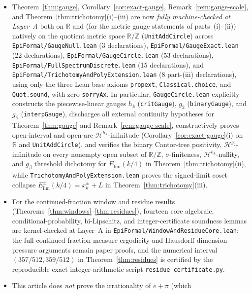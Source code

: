 \documentclass[11pt]{article}
\theoremstyle{definition}
\theoremstyle{remark}
\newcommand{\R}{\mathbb{R}}
\newcommand{\Z}{\mathbb{Z}}
\begin{document}
\begin{itemize}[leftmargin=1.5em]
unweighted-zero strictness witness
(\texttt{Unweighted\allowbreak Correction.\allowbreak witness} in Remark~\ref{rem:unweighted})
are likewise kernel-checked at Layer~A.
\item Theorem~\ref{thm:gauge}, Corollary~\ref{cor:exact-gauge},
Remark~\ref{rem:gauge-scale}, and Theorem~\ref{thm:trichotomy}(i)--(iii) are now
\emph{fully machine-checked at Layer~A} both on $\R$ and (for the metric gauge
statements of parts~(i)--(ii)) natively on the
quotient metric space $\R/\Z$ (\texttt{UnitAddCircle}) across
\texttt{EpiFormal/\allowbreak GaugeNull.lean} (3 declarations),
\texttt{EpiFormal/\allowbreak GaugeExact.lean} (22 declarations),
\texttt{EpiFormal/\allowbreak GaugeCircle.lean} (53 declarations),
\texttt{EpiFormal/\allowbreak FullSpectrumDiscrete.lean} (15 declarations), and
\texttt{EpiFormal/\allowbreak TrichotomyAndPolyExtension.lean} (8 part-(iii)
declarations), using only
the three Lean base axioms \texttt{propext}, \texttt{Classical.choice}, and
\texttt{Quot.sound}, with zero \texttt{sorryAx}. In particular,
\texttt{GaugeCircle.lean} explicitly constructs the piecewise-linear gauges
$h_k$ (\texttt{critGauge}), $g_2$ (\texttt{binaryGauge}), and $g_\beta$
(\texttt{interpGauge}), discharges all external continuity hypotheses for
Theorem~\ref{thm:gauge} and Remark~\ref{rem:gauge-scale}, constructively proves
open-interval and open-arc $\mathcal H^{h_k}$-infinitude
(Corollary~\ref{cor:exact-gauge}(i) on $\R$ and \texttt{UnitAddCircle}), and
verifies the binary Cantor-tree positivity, $\mathcal H^{g_2}$-infinitude on
every nonempty open subset of $\R/\Z$, $\sigma$-finiteness,
$\mathcal H^{h_k}$-nullity, and $g_\beta$ threshold dichotomy for
$E_{\mathrm{lim}}(k/4)$ in Theorem~\ref{thm:trichotomy}(ii), while
\texttt{TrichotomyAndPolyExtension.lean} proves the signed-limit coset collapse
$E_{\mathrm{lim}}^\pm(k/4)=x_k^\pm+L$ in Theorem~\ref{thm:trichotomy}(iii).
\item For the continued-fraction window and residue results
(Theorems~\ref{thm:windows}--\ref{thm:residues}), fourteen core algebraic,
conditional-probability, bi-Lipschitz, and integer-certificate soundness lemmas
are kernel-checked at Layer~A in
\texttt{EpiFormal/\allowbreak{}Window\allowbreak{}And\allowbreak{}Residue\allowbreak{}Core.lean};
the full continued-fraction measure ergodicity and Hausdorff-dimension pressure
arguments remain paper proofs, and the numerical interval $(357/512,359/512)$ in
Theorem~\ref{thm:residues} is certified by the reproducible exact
integer-arithmetic script \texttt{residue\_certificate.py}.
\item This article does \emph{not} prove the irrationality of $e+\pi$ (which

\end{itemize}
\end{document}
